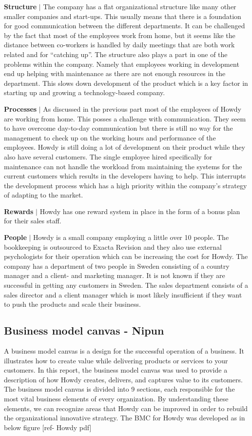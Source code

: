 \noindent \textbf{Structure} $|$ The company has a flat organizational structure like many other smaller companies and start-ups. This usually means that there is a foundation for good communication between the different departments. It can be challenged by the fact that most of the employees work from home, but it seems like the distance between co-workers is handled by daily meetings that are both work related and for “catching up”. The structure also plays a part in one of the problems within the company. Namely that employees working in development end up helping with maintenance as there are not enough resources in the department. This slows down development of the product which is a key factor in starting up and growing a technology-based company.

\noindent \textbf{Processes} $|$ As discussed in the previous part most of the employees of Howdy are working from home. This posses a challenge with communication. They seem to have overcome day-to-day communication but there is still no way for the management to check up on the working hours and performance of the employees.
Howdy is still doing a lot of development on their product while they also have several customers. The single employee hired specifically for maintenance can not handle the workload from maintaining the systems for the current customers which results in the developers having to help. This interrupts the development process which has a high priority within the company’s strategy of adapting to the market.

\noindent \textbf{Rewards} $|$ Howdy has one reward system in place in the form of a bonus plan for their sales staff.

\noindent \textbf{People} $|$ Howdy is a small company employing a little over 10 people. The bookkeeping is outsourced to Exacta Revision and they also use external psychologists for their operation which can be increasing the cost for Howdy.
The company has a department of two people in Sweden consisting of a country manager and a client- and marketing manager. It is not known if they are successful in getting any customers in Sweden.
The sales department consists of a sales director and a client manager which is most likely insufficient if they want to push the products and scale their business.


\subsection{Business model canvas - Nipun}
A business model canvas is a design for the successful operation of a business. It illustrates how to create value while delivering products or services to your customers. In this report, the business model canvas was used to provide a description of how Howdy creates, delivers, and captures value to its customers. The business model canvas is divided into 9 sections, each responsible for the most vital business elements of every organization. By understanding these elements, we can recognize areas that Howdy can be improved in order to rebuild the organizational innovative strategy. The BMC for Howdy was developed as in below figure [ref- Howdy pdf]\\

